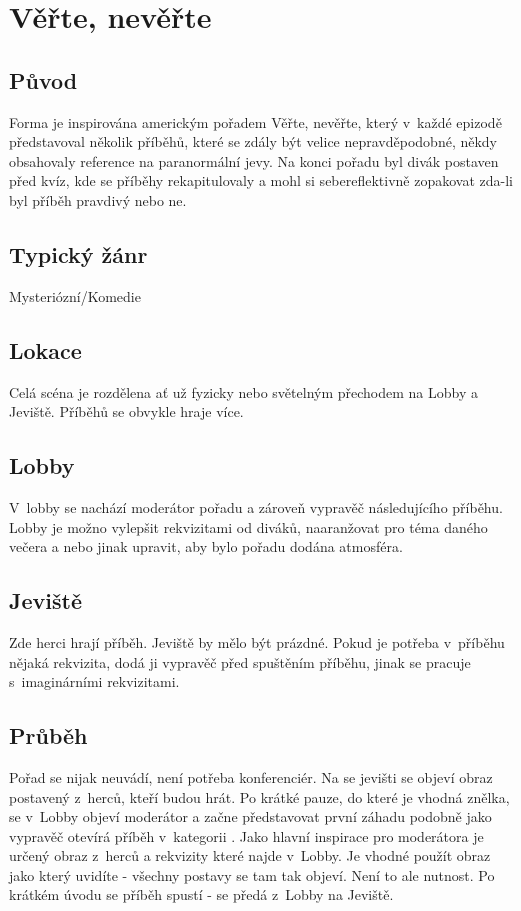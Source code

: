 \needspace{5cm} \section{Věřte, nevěřte} \label{věřte, nevěřte} \subsection{ Původ }  
Forma je inspirována americkým pořadem Věřte, nevěřte, který v~každé epizodě představoval několik příběhů, které se zdály být velice nepravděpodobné, někdy obsahovaly reference na paranormální jevy. Na konci pořadu byl divák postaven před kvíz, kde se příběhy rekapitulovaly a mohl si sebereflektivně zopakovat zda-li byl příběh pravdivý nebo ne. 
 
\subsection{ Typický žánr }  
Mysteriózní/Komedie 
 
\subsection{ Lokace }  
Celá scéna je rozdělena ať už fyzicky nebo světelným přechodem na Lobby a Jeviště. Příběhů se obvykle hraje více. 
 
\subsection{ Lobby }  
V~lobby se nachází moderátor pořadu a zároveň vypravěč následujícího příběhu. Lobby je možno vylepšit rekvizitami od diváků, naaranžovat pro téma daného večera a nebo jinak upravit, aby bylo pořadu dodána atmosféra. 
 
\subsection{ Jeviště}  
Zde herci hrají příběh. Jeviště by mělo být prázdné. Pokud je potřeba v~příběhu nějaká rekvizita, dodá ji vypravěč před spuštěním příběhu, jinak se pracuje s~imaginárními rekvizitami. 
 
\subsection{ Průběh }  
Pořad se nijak neuvádí, není potřeba konferenciér. Na se jevišti se objeví obraz postavený z~herců, kteří budou hrát. Po krátké pauze, do které je vhodná znělka, se v~Lobby objeví moderátor a začne představovat první záhadu podobně jako vypravěč otevírá příběh v~kategorii . Jako hlavní inspirace pro moderátora je určený obraz z~herců a rekvizity které najde v~Lobby. Je vhodné použít obraz jako   který uvidíte - všechny postavy se tam tak objeví. Není to ale nutnost. Po krátkém úvodu se příběh spustí -  se předá z~Lobby na Jeviště.  
 

